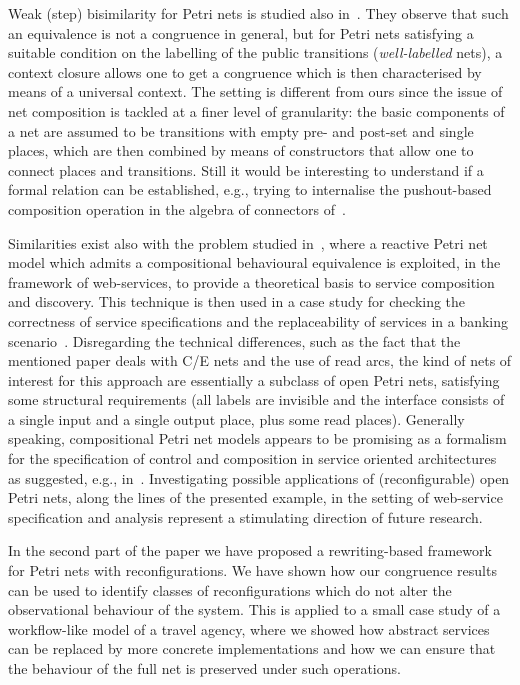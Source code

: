 \documentclass{LMCS}
\begin{document}
Weak (step) bisimilarity for Petri nets is studied also
in~\cite{NPS:CBCP}. They observe that such an equivalence is not a
congruence in general, but for Petri nets satisfying a suitable condition on
the labelling of the public transitions (\emph{well-labelled} nets), a
context closure allows one to get a congruence which is then
characterised by means of a universal context.
The setting is
different from ours since the issue of net composition is tackled at a
finer level of granularity: the basic components of a net are assumed
to be transitions with empty pre- and post-set and single places,
which are then combined by means of constructors that allow one to
connect places and transitions.
Still it would be interesting to understand if a formal relation can be
established, e.g., trying to internalise the pushout-based
composition operation in the algebra of connectors of~\cite{NPS:CBCP}.

Similarities exist also with the problem studied in~\cite{BBCG:BCWS}, where
a reactive Petri net model which admits a compositional behavioural
equivalence is exploited, in the framework of web-services, to provide
a theoretical basis to service composition and discovery. This
technique is then used in a case study for checking the correctness of
service specifications and the replaceability of services in a banking
scenario~\cite{bbcg:web-services-equ}.
Disregarding the technical differences, such as the fact that the
mentioned paper deals with C/E nets and the use of read arcs, the kind
of nets of interest for this approach are essentially a subclass of
open Petri nets, satisfying some structural requirements (all labels
are invisible and the interface consists of a single input and a
single output place, plus some read places).
Generally speaking, compositional Petri net models appears to be
promising as a formalism for the specification of control and
composition in service oriented architectures as suggested, e.g.,
in~\cite{BB:PNBMWS,Mar:AWS,AH:YAWL,MRS:OGA}.
Investigating possible applications of (reconfigurable) open Petri
nets, along the lines of the presented example, in the setting of
web-service specification and analysis represent a stimulating
direction of future research.

In the second part of the paper we have proposed a rewriting-based
framework for Petri nets with reconfigurations. We have shown how our
congruence results
can be used to identify classes of reconfigurations which do not alter
the observational behaviour of the system.
This is applied to a small case study of a workflow-like model of a
travel agency, where we showed how abstract services can be replaced
by more concrete implementations and how we can ensure that the
behaviour of the full net is preserved under such operations.
\end{document}

